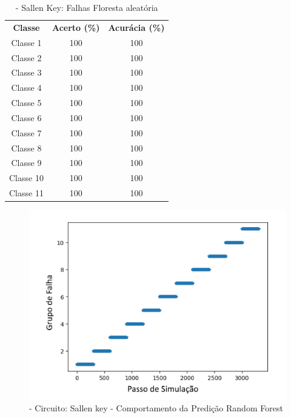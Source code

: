 \begin{itemize}
 \begin{table}[ht]
\centering
\begin{tabular}{ccc}
\textbf{Classe} & \textbf{Acerto (\%)} & \textbf{Acurácia (\%)} \\
Classe 1        & 100                  & 100                    \\
Classe 2        & 100                  & 100                    \\
Classe 3        & 100                  & 100                    \\
Classe 4        & 100                  & 100                    \\
Classe 5        & 100                  & 100                    \\
Classe 6        & 100                  & 100                    \\
Classe 7        & 100                  & 100                    \\
Classe 8        & 100                  & 100                    \\
Classe 9        & 100                  & 100                    \\
Classe 10       & 100                  & 100                    \\
Classe 11       & 100                  & 100                                  
\end{tabular}
\caption{\label{tab:sallenrandom}- Sallen Key: Falhas Floresta aleatória}
\end{table}


  \begin{figure}[H]
        \begin{center}
        \includegraphics[width=13cm]{./01_Pre_textuais/sallen_figs/RandomForestClassifier_Sallen_Key_mc_+_4bitPRBS_[FALHA]raw.png}
        \caption{\label{fig:randomforestClassifieSalenkey}- Circuito: Sallen key - Comportamento da Predição Random Forest }
        \end{center}
        \end{figure}


\end{itemize}
